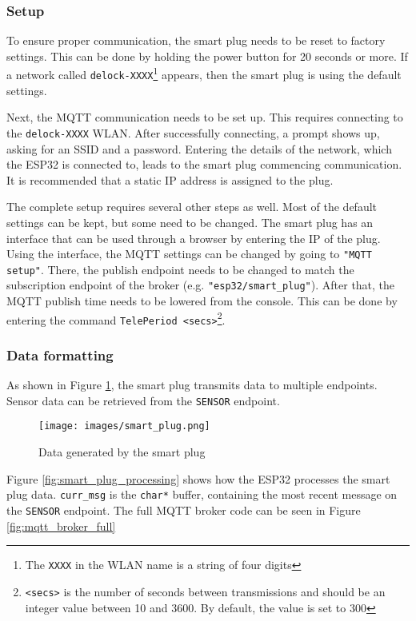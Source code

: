 \subsubsection{Setup}
To ensure proper communication, the smart plug needs to be reset to factory settings. This can be done by holding the power button for 20 seconds or more. If a network called \lstinline|delock-XXXX|\footnote{The \lstinline|XXXX| in the WLAN name is a string of four digits} appears, then the smart plug is using the default settings.

Next, the MQTT communication needs to be set up. This requires connecting to the \lstinline|delock-XXXX| WLAN. After successfully connecting, a prompt shows up, asking for an SSID and a password. Entering the details of the network, which the ESP32 is connected to, leads to the smart plug commencing communication. It is recommended that a static IP address is assigned to the plug.

The complete setup requires several other steps as well. Most of the default settings can be kept, but some need to be changed. The smart plug has an interface that can be used through a browser by entering the IP of the plug. Using the interface, the MQTT settings can be changed by going to \lstinline|"MQTT setup"|. There, the publish endpoint needs to be changed to match the subscription endpoint of the broker (e.g. \lstinline{"esp32/smart_plug"}). After that, the MQTT publish time needs to be lowered from the console. This can be done by entering the command \lstinline|TelePeriod <secs>|\footnote{\lstinline|<secs>| is the number of seconds between transmissions and should be an integer value between 10 and 3600. By default, the value is set to 300}.

\subsubsection{Data formatting}
As shown in Figure \ref{fig:smart_plug_endpoints}, the smart plug transmits data to multiple endpoints. Sensor data can be retrieved from the \lstinline{SENSOR} endpoint. 

\begin{figure}[ht]
    \centering
    \texttt{[image: images/smart\_plug.png]}
    \caption{Data generated by the smart plug}
    \label{fig:smart_plug_endpoints}
\end{figure}

Figure \ref{fig:smart_plug_processing} shows how the ESP32 processes the smart plug data. \lstinline|curr_msg| is the \lstinline|char*| buffer, containing the most recent message on the \lstinline|SENSOR| endpoint. The full MQTT broker code can be seen in Figure \ref{fig:mqtt_broker_full}

